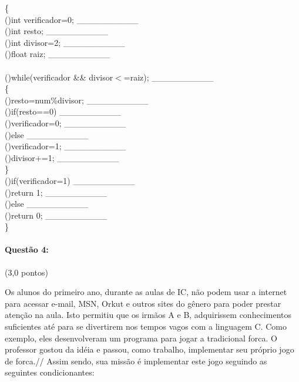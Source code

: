 \documentclass[12pt,a4paper]{article}
\begin{document}
\{\\
(\;\;)\;int verificador=0;\;\;\; \_\_\_\_\_\_\_\_\_\_\\
(\;\;)\;int resto;\;\;\; \_\_\_\_\_\_\_\_\_\_\\
(\;\;)\;int divisor=2;\;\;\; \_\_\_\_\_\_\_\_\_\_\\
(\;\;)\;float raiz;\;\;\; \_\_\_\_\_\_\_\_\_\_ \\
\\
(\;\;)\;while(verificador \&\& divisor$<$=raiz);\;\;\; \_\_\_\_\_\_\_\_\_\_ \\
\{\\
(\;\;)\;\qquad resto=num\%divisor;\;\;\; \_\_\_\_\_\_\_\_\_\_\\
(\;\;)\;\qquad if(resto==0)\;\;\; \_\_\_\_\_\_\_\_\_\_\\
(\;\;)\;\qquad \qquad verificador=0;\;\;\; \_\_\_\_\_\_\_\_\_\_\\
(\;\;)\;\qquad else\;\;\; \_\_\_\_\_\_\_\_\_\_ \\
(\;\;)\;\qquad \qquad verificador=1;\;\;\; \_\_\_\_\_\_\_\_\_\_ \\
(\;\;)\;\qquad divisor+=1;\;\;\; \_\_\_\_\_\_\_\_\_\_ \\
\}\\
(\;\;)\;if(verificador=1)\;\;\; \_\_\_\_\_\_\_\_\_\_ \\
(\;\;)\;\qquad return 1;\;\;\; \_\_\_\_\_\_\_\_\_\_ \\
(\;\;)\;else\;\;\; \_\_\_\_\_\_\_\_\_\_ \\
(\;\;)\;\qquad return 0;\;\;\; \_\_\_\_\_\_\_\_\_\_ \\
\}

\paragraph{Questão 4:}(3,0 pontos)

Os alunos do primeiro ano, durante as aulas de IC, não podem usar a internet para acessar e-mail, MSN, Orkut e outros sites do gênero para poder prestar atenção na aula. Isto permitiu que os irmãos A e B, adquirissem conhecimentos suficientes até para se divertirem nos tempos vagos com a linguagem C. Como exemplo, eles desenvolveram um programa para jogar a tradicional forca. O professor gostou da idéia e passou, como trabalho, implementar seu próprio jogo de forca.//
Assim sendo, sua missão é implementar este jogo seguindo as seguintes condicionantes:
\end{document}
